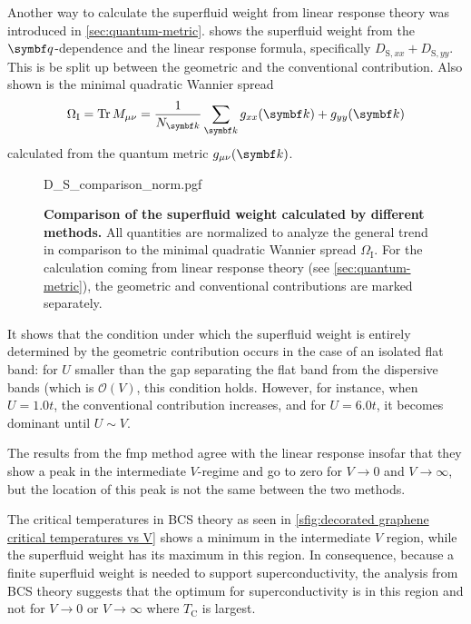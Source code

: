 \documentclass[../notes.tex]{subfiles}
\begin{document}
Another way to calculate the superfluid weight from linear response theory was introduced in \cref{sec:quantum-metric}.
 shows the superfluid weight from the \(\vb{q}\)-dependence and the linear response formula, specifically \(D_{\mathrm{S}, xx} + D_{\mathrm{S}, yy}\).
This is be split up between the geometric and the conventional contribution.
Also shown is the minimal quadratic Wannier spread
\begin{equation}
	\Omega_{\mathrm{I}} = \Tr M_{\mu \nu} = \frac{1}{N_{\vb{k}}} \sum_{\vb{k}} g_{xx} (\vb{k}) + g_{yy} (\vb{k})
\end{equation}
calculated from the quantum metric \(g_{\mu \nu} (\vb{k})\).
\begin{figure}[!tb]
	\centering
	{D_S_comparison_norm.pgf}
	\caption[Comparison of the superfluid weight calculated by different methods.]{
		\textbf{Comparison of the superfluid weight calculated by different methods.} All quantities are normalized to analyze the general trend in comparison to the minimal quadratic Wannier spread \(\Omega_{\mathrm{I}}\).
		For the calculation coming from linear response theory (see \cref{sec:quantum-metric}), the geometric and conventional contributions are marked separately.
	}
	\label{fig:decorated graphene comparison of DS normalized}
\end{figure}
It shows that the condition under which the superfluid weight is entirely determined by the geometric contribution \cite{peottaSuperfluidityTopologicallyNontrivial2015} occurs in the case of an isolated flat band: for \(U\) smaller than the gap separating the flat band from the dispersive bands (which is \(\mathcal{O} (V)\), this condition holds.
However, for instance, when \(U = 1.0t\), the conventional contribution increases, and for \(U = 6.0t\), it becomes dominant until \(U \sim V\).

The results from the \gls{fmp} method agree with the linear response insofar that they show a peak in the intermediate \(V\)-regime and go to zero for \(V \to 0\) and \(V \to \infty\), but the location of this peak is not the same between the two methods.

The critical temperatures in BCS theory as seen in \cref{sfig:decorated graphene critical temperatures vs V} shows a minimum in the intermediate \(V\) region, while the superfluid weight has its maximum in this region.
In consequence, because a finite superfluid weight is needed to support superconductivity, the analysis from BCS theory suggests that the optimum for superconductivity is in this region and not for \(V \to 0\) or \(V \to \infty\) where \(T_{\mathrm{C}}\) is largest.
\end{document}
